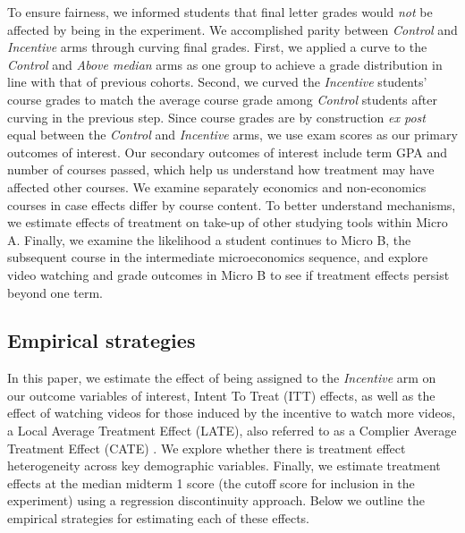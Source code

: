 \documentclass[12pt]{article}
\begin{document}
To ensure fairness, we informed students that final letter grades would \textit{not} be affected by being in the experiment. We accomplished parity between \textit{Control} and \textit{Incentive} arms through curving final grades. First, we applied a curve to the \textit{Control} and \textit{Above median} arms as one group to achieve a grade distribution in line with that of previous cohorts. Second, we curved the \textit{Incentive} students' course grades to match the average course grade among \textit{Control} students after curving in the previous step. Since course grades are by construction \textit{ex post} equal between the \textit{Control} and \textit{Incentive} arms, we use exam scores as our primary outcomes of interest. Our secondary outcomes of interest include term GPA and number of courses passed, which help us understand how treatment may have affected other courses. We examine separately economics and non-economics courses in case effects differ by course content. To better understand mechanisms, we estimate effects of treatment on take-up of other studying tools within Micro A. Finally, we examine the likelihood a student continues to Micro B, the subsequent course in the intermediate microeconomics sequence, and explore video watching and grade outcomes in Micro B to see if treatment effects persist beyond one term.



\subsection{Empirical strategies} \label{empiricalstrat}

In this paper, we estimate the effect of being assigned to the \textit{Incentive} arm on our outcome variables of interest, Intent To Treat (ITT) effects, as well as the effect of watching videos for those induced by the incentive to watch more videos, a Local Average Treatment Effect (LATE), also referred to as a Complier Average Treatment Effect (CATE) \parencite{ir2015}. We explore whether there is treatment effect heterogeneity across key demographic variables. Finally, we estimate treatment effects at the median midterm 1 score (the cutoff score for inclusion in the experiment) using a regression discontinuity approach. Below we outline the empirical strategies for estimating each of these effects.
\end{document}
